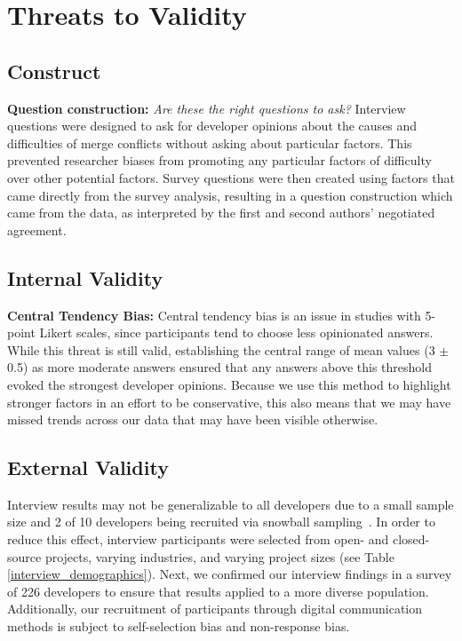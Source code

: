\section{Threats to Validity}\label{threats}
\subsection{Construct}
\textbf{Question construction:}
\textit{Are these the right questions to ask?} Interview questions were designed to ask for developer opinions about the causes and difficulties of merge conflicts without asking about particular factors. This prevented researcher biases from promoting any particular factors of difficulty over other potential factors. 
Survey questions were then created using factors that came directly from the survey analysis, resulting in a question construction which came from the data, as interpreted by the first and second authors' negotiated agreement.
\subsection{Internal Validity}
\textbf{Central Tendency Bias:}
Central tendency bias \cite{guilford1954psychometric} is an issue in studies with 5-point Likert scales, since participants tend to choose less opinionated answers. While this threat is still valid, establishing the central range of mean values (3 $\pm$ 0.5) as more moderate answers ensured that any answers above this threshold evoked the strongest developer opinions. Because we use this method to highlight stronger factors in an effort to be conservative, this also means that we may have missed trends across our data that may have been visible otherwise.

\subsection{External Validity}
Interview results may not be generalizable to all developers due to a small sample size and 2 of 10 developers being recruited via snowball sampling~\cite{goodman1961snowball}. In order to reduce this effect, interview participants were selected from open- and closed-source projects, varying industries, and varying project sizes (see Table \ref{interview_demographics}). Next, we confirmed our interview findings in a survey of 226 developers to ensure that results applied to a more diverse population. Additionally, our recruitment of participants through digital communication methods is subject to self-selection bias and non-response bias.

